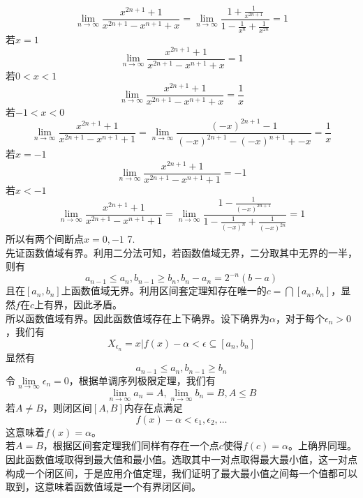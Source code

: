 \documentclass[utf8]{ctexart}
\begin{document}
\[\lim\limits_{n\rightarrow\infty}\frac{x^{2n+1}+1}{x^{2n+1}-x^{n+1}+x}=\lim\limits_{n\rightarrow\infty}\frac{1+\frac{1}{x^{2n+1}}}{1-\frac{1}{x^n}+\frac{1}{x^{2n}}}=1\]
若$x=1$
\[\lim\limits_{n\rightarrow\infty}\frac{x^{2n+1}+1}{x^{2n+1}-x^{n+1}+x}=1\]
若$0<x<1$
\[\lim\limits_{n\rightarrow\infty}\frac{x^{2n+1}+1}{x^{2n+1}-x^{n+1}+x}=\frac{1}{x}\]
若$-1<x<0$
\[\lim\limits_{n\rightarrow\infty}\frac{x^{2n+1}+1}{x^{2n+1}-x^{n+1}+1}=\lim\limits_{n\rightarrow\infty}\frac{(-x)^{2n+1}-1}{(-x)^{2n+1}-(-x)^{n+1}+-x}=\frac{1}{x}\]
若$x=-1$
\[\lim\limits_{n\rightarrow\infty}\frac{x^{2n+1}+1}{x^{2n+1}-x^{n+1}+1}=-1\]
若$x<-1$
\[\lim\limits_{n\rightarrow\infty}\frac{x^{2n+1}+1}{x^{2n+1}-x^{n+1}+1}=\lim\limits_{n\rightarrow\infty}\frac{1-\frac{1}{(-x)^{2n+1}}}{1-\frac{1}{(-x)^n}+\frac{1}{(-x)^{2n}}}=1\]
所以有两个间断点$x=0,-1$
7.\\
先证函数值域有界。利用二分法可知，若函数值域无界，二分取其中无界的一半，则有
\[a_{n-1}\le a_{n},b_{n-1}\ge b_n,b_n-a_n=2^{-n}(b-a)\]
且在$[a_n,b_n]$上函数值域无界。利用区间套定理知存在唯一的$c=\bigcap[a_n,b_n]$，显然$f$在$c$上有界，因此矛盾。\\
所以函数值域有界。因此函数值域存在上下确界。设下确界为$\alpha$，对于每个$\epsilon_n>0$，我们有
\[X_{\epsilon_n}={x|f(x)-\alpha<\epsilon}\subseteq[a_n,b_n]\]
显然有
\[a_{n-1}\le a_{n},b_{n-1}\ge b_n\]
令$\lim\limits_{n\rightarrow\infty}\epsilon_n=0$，根据单调序列极限定理，我们有
\[\lim\limits_{n\rightarrow\infty}a_n=A,\lim\limits_{n\rightarrow\infty}b_n=B,A\le B\]
若$A\neq B$，则闭区间$[A,B]$内存在点满足
\[f(x)-\alpha<\epsilon_1,\epsilon_2,\dots\]
这意味着$f(x)=\alpha$。\\
若$A=B$，根据区间套定理我们同样有存在一个点$c$使得$f(c)=\alpha$。上确界同理。因此函数值域取得到最大值和最小值。选取其中一对点取得最大最小值，这一对点构成一个闭区间，于是应用介值定理，我们证明了最大最小值之间每一个值都可以取到，这意味着函数值域是一个有界闭区间。
\end{document}
